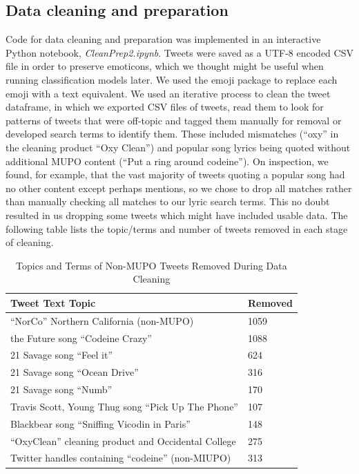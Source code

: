 \documentclass[sigconf]{acmart}
\begin{document}

\subsection{Data cleaning and preparation}

Code for data cleaning and preparation was implemented in an interactive 
Python notebook, \emph{CleanPrep2.ipynb}. Tweets were saved as a UTF-8 encoded 
CSV file in order to preserve emoticons, which we thought might be useful when 
running classification models later. We used the emoji package \cite{pkgRef3} 
to replace each emoji with a text equivalent. We used an iterative process to 
clean the tweet dataframe, in which we exported CSV files of tweets, read them 
to look for patterns of tweets that were off-topic and tagged them manually for 
removal or developed search terms to identify them. These included mismatches 
(``oxy'' in the cleaning product ``Oxy Clean'') and popular song lyrics being 
quoted without additional MUPO content (``Put a ring around codeine''). On 
inspection, we found, for example, that the vast majority of tweets quoting a 
popular song had no other content except perhaps mentions, so we chose to drop 
all matches rather than manually checking all matches to our lyric search terms. 
This no doubt resulted in us dropping some tweets which might have included 
usable data. The following table lists the topic/terms and number of tweets 
removed in each stage of cleaning.

\begin{table}[htb]
\centering
\caption{Topics and Terms of Non-MUPO Tweets Removed During Data Cleaning}
\label{t:mytable}
\begin{tabular*}{\columnwidth}{ll}
  \toprule
  Tweet Text Topic& Removed \\
  \midrule
  ``NorCo'' Northern California (non-MUPO) & 1059 \\
  the Future song ``Codeine Crazy''  & 1088 \\
  21 Savage song ``Feel it'' & 624 \\
  21 Savage song ``Ocean Drive''  & 316 \\
  21 Savage song ``Numb'' & 170 \\
  Travis Scott, Young Thug song ``Pick Up The Phone'' & 107 \\
  Blackbear song ``Sniffing Vicodin in Paris'' & 148 \\
  ``OxyClean'' cleaning product and Occidental College & 275 \\
  Twitter handles containing ``codeine'' (non-MIUPO) & 313 \\
  \bottomrule
\end{tabular*}
\end{table}
\end{document}

